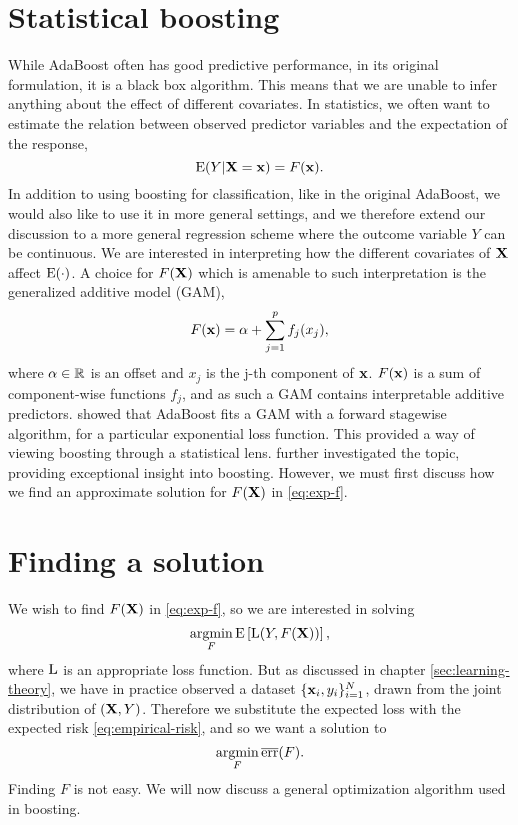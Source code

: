 \section{Statistical boosting}\label{sec:sboost}
While AdaBoost often has good predictive performance, in its original formulation, it is a black box algorithm. This means that we are unable to infer anything about the effect of different covariates. In statistics, we often want to estimate the relation between observed predictor variables and the expectation of the response,
\begin{equation}\label{eq:exp-f}
    \operatorname{E}(Y|\mathbf{X}=\mathbf{x})=F(\mathbf{x}).
\end{equation}
In addition to using boosting for classification, like in the original AdaBoost, we would also like to use it in more general settings, and we therefore extend our discussion to a more general regression scheme where the outcome variable $Y$ can be continuous. We are interested in interpreting how the different covariates of $\mathbf{X}$ affect $\operatorname{E}(\cdot)$. A choice for $F(\mathbf{X})$ which is amenable to such interpretation is the generalized additive model (GAM),
\begin{equation}\label{eq:gam}
    F(\mathbf{x})=\alpha+\sum_{j=1}^pf_j(x_j),
\end{equation}
where $\alpha\in\mathbb{R}$ is an offset and $x_j$ is the j-th component of $\mathbf{x}$. $F(\mathbf{x})$ is a sum of component-wise functions $f_j$, and as such a GAM contains interpretable additive predictors. \cite{friedman2000} showed that AdaBoost fits a GAM with a forward stagewise algorithm, for a particular exponential loss function. This provided a way of viewing boosting through a statistical lens. \cite{friedman2001} further investigated the topic, providing exceptional insight into boosting. However, we must first discuss how we find an approximate solution for $F(\mathbf{X})$ in \eqref{eq:exp-f}.

\section{Finding a solution}
We wish to find $F(\mathbf{X})$ in \eqref{eq:exp-f}, so we are interested in solving
\begin{equation*}
    \operatorname*{argmin}_{F}\operatorname{E}\left[\operatorname{L}(Y,F(\mathbf{X}))\right],
\end{equation*}
where $\operatorname{L}$ is an appropriate loss function. But as discussed in chapter \ref{sec:learning-theory}, we have in practice observed a dataset $\{\mathbf{x}_i,y_i\}_{i=1}^N$, drawn from the joint distribution of $(\mathbf{X},Y)$. Therefore we substitute the expected loss with the expected risk \eqref{eq:empirical-risk}, and so we want a solution to
\begin{equation}\label{eq:argmin-risk}
    \operatorname*{argmin}_{F}\overline{\text{err}}(F).
\end{equation}
Finding $F$ is not easy. We will now discuss a general optimization algorithm used in boosting.

